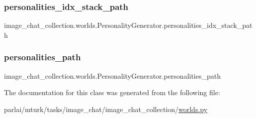 \subsubsection{\texorpdfstring{personalities\+\_\+idx\+\_\+stack\+\_\+path}{personalities\_idx\_stack\_path}}
{\footnotesize\ttfamily image\+\_\+chat\+\_\+collection.\+worlds.\+Personality\+Generator.\+personalities\+\_\+idx\+\_\+stack\+\_\+path}

\mbox{\label{classimage__chat__collection_1_1worlds_1_1PersonalityGenerator_a1d40759bb3feb63f32181b1b623437d2}} 
\subsubsection{\texorpdfstring{personalities\+\_\+path}{personalities\_path}}
{\footnotesize\ttfamily image\+\_\+chat\+\_\+collection.\+worlds.\+Personality\+Generator.\+personalities\+\_\+path}



The documentation for this class was generated from the following file\+:\begin{DoxyCompactItemize}
\item 
parlai/mturk/tasks/image\+\_\+chat/image\+\_\+chat\+\_\+collection/\hyperlink{parlai_2mturk_2tasks_2image__chat_2image__chat__collection_2worlds_8py}{worlds.\+py}\end{DoxyCompactItemize}
